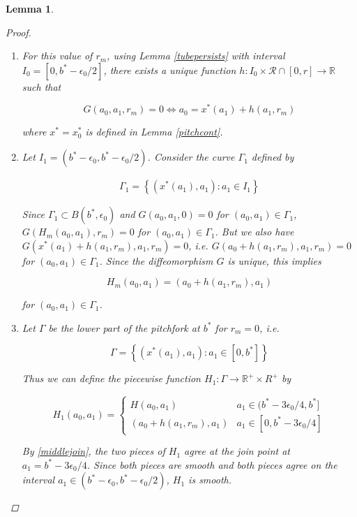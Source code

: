 \documentclass[12pt]{article}
\def\R{{\mathbb R}}
\newtheorem{lemma}{Lemma}
\begin{document}
\begin{lemma}
\begin{proof}
\begin{enumerate}
\item For this value of $r_m$, using Lemma \ref{tubepersists} with interval $I_0 = [0, b^* - \epsilon_0/2]$, there exists a unique function $h: I_0 \times \mathcal{R} \cap [0, r] \rightarrow \R$ such that

\begin{equation}
G(a_0, a_1, r_m) = 0 \iff a_0 = x^*(a_1) + h(a_1, r_m)
\end{equation}

where $x^* = x_0^*$ is defined in Lemma \ref{pitchcont}. 

\item Let $I_1 = (b^* - \epsilon_0, b^* - \epsilon_0/2)$. Consider the curve $\Gamma_1$ defined by

\begin{align*}
\Gamma_1 = \left\{ (x^*(a_1), a_1) : a_1 \in I_1 \right\}
\end{align*}

Since $\Gamma_1 \subset B(b^*, \epsilon_0)$ and $G(a_0, a_1, 0) = 0$ for $(a_0, a_1) \in \Gamma_1$, $G(H_m(a_0, a_1), r_m) = 0$ for $(a_0, a_1) \in \Gamma_1$. But we also have $G(x^*(a_1) + h(a_1, r_m), a_1, r_m) = 0$, i.e. $G(a_0 + h(a_1, r_m), a_1, r_m) = 0$ for $(a_0, a_1) \in \Gamma_1$. Since the diffeomorphism $G$ is unique, this implies 

\begin{equation}\label{middlejoin}
H_m(a_0, a_1) = (a_0 + h(a_1, r_m), a_1)
\end{equation}

for $(a_0, a_1) \in \Gamma_1$.

\item Let $\Gamma$ be the lower part of the pitchfork at $b^*$ for $r_m = 0$, i.e. 

\begin{equation}
\Gamma = \left\{ (x^*(a_1), a_1) : a_1 \in [0, b^*] \right\}
\end{equation}

Thus we can define the piecewise function $H_1: \Gamma \rightarrow \R^+ \times R^+$ by

\begin{equation}
H_1(a_0, a_1) = \begin{cases}
H(a_0, a_1) & a_1 \in (b^* - 3 \epsilon_0/4, b^*] \\
(a_0 + h(a_1, r_m), a_1) & a_1 \in [0, b^* - 3 \epsilon_0/4]
\end{cases}
\end{equation}

By \eqref{middlejoin}, the two pieces of $H_1$ agree at the join point at $a_1 = b^* - 3 \epsilon_0/4$. Since both pieces are smooth and both pieces agree on the interval $a_1 \in (b^* - \epsilon_0, b^* - \epsilon_0/2)$, $H_1$ is smooth.\\


\end{enumerate}
\end{proof}
\end{lemma}
\end{document}
